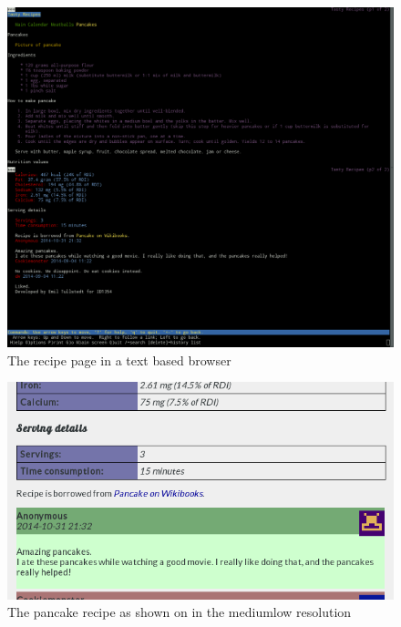\documentclass[a4paper]{scrartcl}
\begin{document}
\begin{figure}[!h]
  \begin{center}
    \includegraphics[scale=0.3]{pancakelynxboth.png}
    \caption{The recipe page in a text based browser}
    \label{fig:pancakelynx}
  \end{center}
\end{figure}

\begin{figure}[!h]
  \begin{center}
    \includegraphics[scale=0.3]{pancakemedium1.png}
    \caption{The pancake recipe as shown on in the mediumlow resolution}
    \label{fig:pancakemedium}
  \end{center}
\end{figure}
\end{document}
